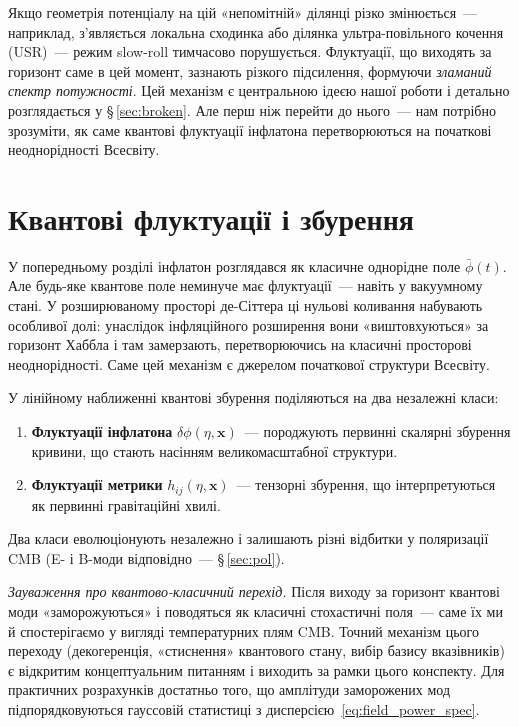 \documentclass[12pt, a4paper]{article}
\begin{document}
Якщо геометрія потенціалу на цій «непомітній» ділянці різко
змінюється~--- наприклад, з'являється локальна сходинка або ділянка
ультра-повільного кочення (USR)~--- режим slow-roll тимчасово
порушується. Флуктуації, що виходять за горизонт саме в цей момент,
зазнають різкого підсилення, формуючи \emph{зламаний спектр
потужності}. Цей механізм є центральною ідеєю нашої роботи і
детально розглядається у §\,\ref{sec:broken}. Але перш ніж перейти
до нього~--- нам потрібно зрозуміти, як саме квантові флуктуації
інфлатона перетворюються на початкові неоднорідності Всесвіту.


\section{Квантові флуктуації і збурення}
\label{sec:quantum}

У попередньому розділі інфлатон розглядався як класичне однорідне
поле $\bar{\phi}(t)$. Але будь-яке квантове поле неминуче має
флуктуації~--- навіть у вакуумному стані. У розширюваному просторі
де-Сіттера ці нульові коливання набувають особливої долі: унаслідок
інфляційного розширення вони «виштовхуються» за горизонт Хаббла і
там замерзають, перетворюючись на класичні просторові неоднорідності.
Саме цей механізм є джерелом початкової структури Всесвіту.

У лінійному наближенні квантові збурення поділяються на два
незалежні класи:
\begin{enumerate}
  \item \textbf{Флуктуації інфлатона} $\delta\phi(\eta, \mathbf{x})$~---
        породжують первинні скалярні збурення кривини, що стають
        насінням великомасштабної структури.
  \item \textbf{Флуктуації метрики} $h_{ij}(\eta, \mathbf{x})$~---
        тензорні збурення, що інтерпретуються як первинні
        гравітаційні хвилі.
\end{enumerate}
Два класи еволюціонують незалежно і залишають різні відбитки
у поляризації CMB (E- і B-моди відповідно~--- §\,\ref{sec:pol}).

\textit{Зауваження про квантово-класичний перехід.}
Після виходу за горизонт квантові моди «заморожуються» і
поводяться як класичні стохастичні поля~--- саме їх ми й
спостерігаємо у вигляді температурних плям CMB. Точний механізм
цього переходу (декогеренція, «стиснення» квантового стану,
вибір базису вказівників) є відкритим концептуальним питанням
і виходить за рамки цього конспекту. Для практичних розрахунків
достатньо того, що амплітуди заморожених мод підпорядковуються
гауссовій статистиці з дисперсією~\eqref{eq:field_power_spec}.
\end{document}
